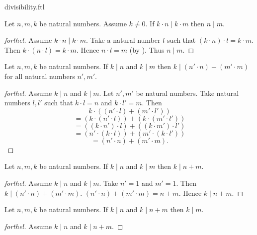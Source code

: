 \documentclass{naproche-library}
\begin{document}
\begin{smodule}{divisibility.ftl}
  \begin{proposition}[forthel,id=ARITHMETIC_07_6469492028735488,printid]
    Let $n, m, k$ be natural numbers.
    Assume $k \neq 0$.
    If $k \cdot n \mid k \cdot m$ then $n \mid m$.
  \end{proposition}
  \begin{proof}[forthel]
    Assume $k \cdot n \mid k \cdot m$.
    Take a natural number $l$ such that $(k \cdot n) \cdot l = k \cdot m$.
    Then $k \cdot (n \cdot l) = k \cdot m$.
    Hence $n \cdot l = m$ (by ).
    Thus $n \mid m$.
  \end{proof}

  \begin{proposition}[forthel,id=ARITHMETIC_07_4700711333920768,printid]
    Let $n, m, k$ be natural numbers.
    If $k \mid n$ and $k \mid m$ then $k \mid (n' \cdot n) + (m' \cdot m)$
    for all natural numbers $n', m'$.
  \end{proposition}
  \begin{proof}[forthel]
    Assume $k \mid n$ and $k \mid m$.
    Let $n', m'$ be natural numbers.
    Take natural numbers $l,l'$ such that $k \cdot l = n$ and $k \cdot l' = m$.
    Then
    \[  k \cdot ((n' \cdot l) + (m' \cdot l'))                \]
    \[    = (k \cdot (n' \cdot l)) + (k \cdot (m' \cdot l'))  \]
    \[    = ((k \cdot n') \cdot l) + ((k \cdot m') \cdot l')  \]
    \[    = (n' \cdot (k \cdot l)) + (m' \cdot (k \cdot l'))  \]
    \[    = (n' \cdot n) + (m' \cdot m).                      \]
  \end{proof}

  \begin{corollary}[forthel,id=ARITHMETIC_07_1556786209357824,printid]
    Let $n, m, k$ be natural numbers.
    If $k \mid n$ and $k \mid m$ then $k \mid n + m$.
  \end{corollary}
  \begin{proof}[forthel]
    Assume $k \mid n$ and $k \mid m$.
    Take $n' = 1$ and $m' = 1$.
    Then $k \mid (n' \cdot n) + (m' \cdot m)$.
    $(n' \cdot n) + (m' \cdot m) = n + m$.
    Hence $k \mid n + m$.
  \end{proof}

  \begin{proposition}[forthel,id=ARITHMETIC_07_1076947887063040,printid]
    Let $n, m, k$ be natural numbers.
    If $k \mid n$ and $k \mid n + m$ then $k \mid m$.
  \end{proposition}
  \begin{proof}[forthel]
    Assume $k \mid n$ and $k \mid n + m$.


\end{proof}
\end{smodule}
\end{document}
